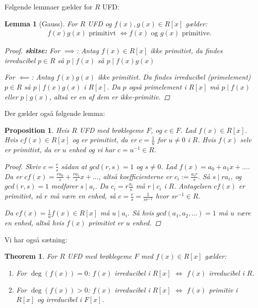 \documentclass[10pt,twoside,openany,final]{memoir}
\theoremstyle{break}
\newtheorem{theorem}[section]{Theorem}
\newtheorem{lemma}[section]{Lemma}
\newtheorem{proposition}[section]{Proposition}
\theoremstyle{Break}
\begin{document}
Følgende lemmaer gælder for $R$ UFD:
\begin{lemma}[Gauss]
For $R$ UFD og $f(x), g(x) \in R[x]$ gælder:
\begin{align*}
f(x)g(x) \text{ primitivt } \iff f(x) \text{ og } g(x) \text{ primitive}.
\end{align*}
\begin{proof}
\textbf{skitse:} For $\implies$: Antag $f(x) \in R[x]$ ikke primitivt, da findes irreducibel $p\in R$ så $p \mid f(x)$ så $p \mid f(x)g(x)$

\noindent For $\impliedby$: Antag $f(x)g(x)$ ikke primitivt. Da findes irreducibel (primelement) $p \in R$ så $p \mid f(x)g(x)$ i $R[x]$. Da $p$ også primelement i $R[x]$ må $p \mid f(x)$ eller $p \mid g(x)$, altså er en af dem er ikke-primitiv.
\end{proof}
\end{lemma}

Der gælder også følgende lemma:
\begin{proposition}
Hvis $R$ UFD med brøklegeme $F$, og $c \in F$. Lad $f(x) \in R[x]$. Hvis $c f(x) \in R[x]$ og er primitivt, da er $c=\frac{1}{u}$ for $u \neq 0$ i $R$. Hvis $f(x)$ selv er primitivt, da er $u $ enhed og vi har $c=u^{-1} \in R$.
\begin{proof}
Skriv $c = \frac{r}{s}$ sådan at $gcd(r,s)=1$ og $s \neq 0$. Lad $f(x)=a_0+a_1x+\dots$. Da er $cf(x)=\frac{ra_0}{s}+\frac{ra_1}{s}x+\dots$, altså koefficienterne er $c_i:= \frac{a_i r}{s}$. Så $s \mid r a_i$, og $gcd(r,s)=1$ medfører $s \mid a_i$. Da $c_i=r \frac{a_i}{s}$ må $r \mid c_i$ i $R$. Antagelsen $cf(x)$ er primitivt, så $r$ må være en enhed, så $c=\frac{r}{s}=\frac{1}{sr^{-1}}$ hvor $sr^{-1} \in R$. 

Da $cf(x) = \frac{1}{u} f(x) \in R[x]$ må $u \mid a_i$. Så hvis $gcd(a_1,a_2,\dots)=1$ må $u$ være en enhed, altså hvis $f(x)$ primitivt er $u$ enhed.
\end{proof}
\end{proposition}

Vi har også sætning:
\begin{theorem}
For $R$ UFD med brøklegeme $F$ med $f(x) \in R[x]$ gælder:
\begin{enumerate}
\item For $\deg(f(x))=0$: $f(x)$ irreducibel i $R[x]$ $\iff$ $f(x)$ irreducibel i $R$.
\item For $\deg(f(x)) > 0$: $f(x)$ irreducibel i $R[x]$ $\iff$ $f(x)$ primitiv i $R[x]$ og irreducibel i $F[x]$.
\end{enumerate}
\end{theorem}
\end{document}
